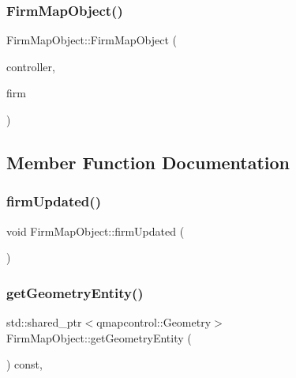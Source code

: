 \subsubsection{\texorpdfstring{FirmMapObject()}{FirmMapObject()}}
{\footnotesize\ttfamily Firm\+Map\+Object\+::\+Firm\+Map\+Object (\begin{DoxyParamCaption}\item[{\mbox{\hyperlink{class_map_objects_controller}{Map\+Objects\+Controller}} $\ast$}]{controller,  }\item[{\mbox{\hyperlink{class_firm_data}{Firm\+Data}} $\ast$}]{firm }\end{DoxyParamCaption})}



\subsection{Member Function Documentation}
\mbox{\label{class_firm_map_object_acd6d8f8e8c09bec7993d403b800db5ff}} 
\subsubsection{\texorpdfstring{firmUpdated()}{firmUpdated()}}
{\footnotesize\ttfamily void Firm\+Map\+Object\+::firm\+Updated (\begin{DoxyParamCaption}{ }\end{DoxyParamCaption})}

\mbox{\label{class_firm_map_object_abdbe45cc9a667c24034d9830d452d8c8}} 
\subsubsection{\texorpdfstring{getGeometryEntity()}{getGeometryEntity()}}
{\footnotesize\ttfamily std\+::shared\+\_\+ptr$<$qmapcontrol\+::\+Geometry$>$ Firm\+Map\+Object\+::get\+Geometry\+Entity (\begin{DoxyParamCaption}{ }\end{DoxyParamCaption}) const\hspace{0.3cm}{\ttfamily [inline]}, {\ttfamily [virtual]}}



